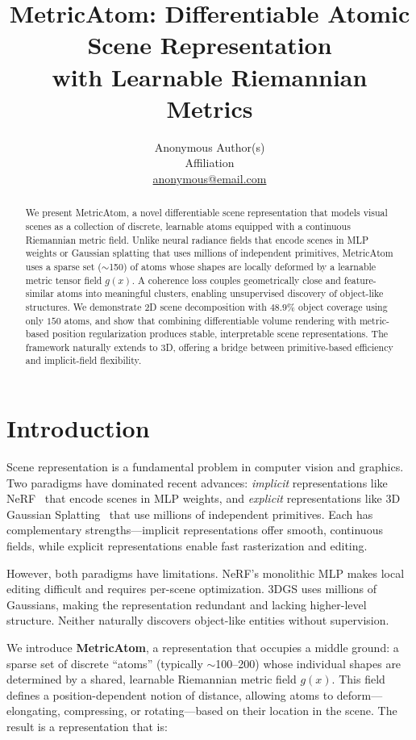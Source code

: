 \documentclass[11pt]{article}
\title{MetricAtom: Differentiable Atomic Scene Representation \\ with Learnable Riemannian Metrics}
\author{Anonymous Author(s) \\
Affiliation \\
\url{anonymous@email.com}}
\date{}
\begin{document}
\maketitle

\begin{abstract}
We present MetricAtom, a novel differentiable scene representation that models visual scenes as a collection of discrete, learnable atoms equipped with a continuous Riemannian metric field. Unlike neural radiance fields that encode scenes in MLP weights or Gaussian splatting that uses millions of independent primitives, MetricAtom uses a sparse set ($\sim$150) of atoms whose shapes are locally deformed by a learnable metric tensor field $g(x)$. A coherence loss couples geometrically close and feature-similar atoms into meaningful clusters, enabling unsupervised discovery of object-like structures. We demonstrate 2D scene decomposition with $48.9\%$ object coverage using only $150$ atoms, and show that combining differentiable volume rendering with metric-based position regularization produces stable, interpretable scene representations. The framework naturally extends to 3D, offering a bridge between primitive-based efficiency and implicit-field flexibility.
\end{abstract}

\section{Introduction}

Scene representation is a fundamental problem in computer vision and graphics. Two paradigms have dominated recent advances: \emph{implicit} representations like NeRF~\cite{nerf} that encode scenes in MLP weights, and \emph{explicit} representations like 3D Gaussian Splatting~\cite{3dgs} that use millions of independent primitives. Each has complementary strengths---implicit representations offer smooth, continuous fields, while explicit representations enable fast rasterization and editing.

However, both paradigms have limitations. NeRF's monolithic MLP makes local editing difficult and requires per-scene optimization. 3DGS uses millions of Gaussians, making the representation redundant and lacking higher-level structure. Neither naturally discovers object-like entities without supervision.

We introduce \textbf{MetricAtom}, a representation that occupies a middle ground: a sparse set of discrete ``atoms'' (typically $\sim$100--200) whose individual shapes are determined by a shared, learnable Riemannian metric field $g(x)$. This field defines a position-dependent notion of distance, allowing atoms to deform---elongating, compressing, or rotating---based on their location in the scene. The result is a representation that is:
\end{document}
